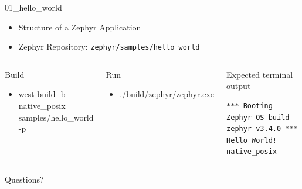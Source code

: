 \documentclass[10pt, aspectratio=169]{beamer}
\begin{document}
\begin{frame}[fragile]{01\_hello\_world}

  \begin{itemize}
     \item Structure of a Zephyr Application
     \item Zephyr Repository: \texttt{zephyr/samples/hello\_world}
  \end{itemize}

  \begin{columns}[T,onlytextwidth]
      \begin{block}{Build}
        \begin{itemize}
          \item {\scriptsize west build -b native\_posix samples/hello\_world -p}
        \end{itemize}
      \end{block}

     \begin{block}{Run}
        \begin{itemize}
          \item {\scriptsize ./build/zephyr/zephyr.exe}
        \end{itemize}
      \end{block}



      \begin{exampleblock}{Expected terminal output}

        {\fontsize{7}{9.6}\selectfont
          \begin{verbatim}
*** Booting Zephyr OS build zephyr-v3.4.0 ***
Hello World! native_posix
          \end{verbatim}
        }
      \end{exampleblock}

  \end{columns}

\end{frame}

\begin{frame}[standout]
  Questions?
\end{frame}
\end{document}
